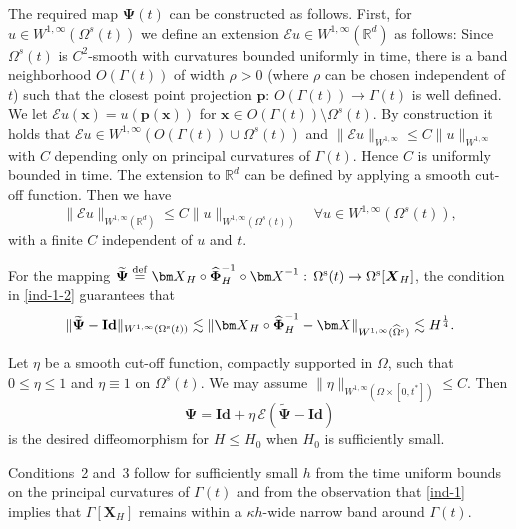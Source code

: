 \documentclass[11pt,reqno]{amsart}
\theoremstyle{definition}
\theoremstyle{plain}
\numberwithin{theorem}{section}
\numberwithin{proposition}{section}
\numberwithin{lemma}{section}
\numberwithin{equation}{section}
\newcommand{\bs}[1]{\boldsymbol{#1}}
\newcommand{\bx}{{\bs x}}
\def\R{{\mathbb{R}}}
\renewcommand{\(}{\bigl(}
\renewcommand{\)}{\bigr)}
\newcommand{\bld}[1]{\boldsymbol{#1}}
\newcommand{\bp}{\bld{p}}
\newcommand{\bX}{{\bm X}}
\def\eqd{\stackrel{\mathrm{def}}{=}}
\begin{document}
The required map ${\bs\Psi}(t)$ can be constructed as follows. First, for $u\in W^{1,\infty}({\Omega}^s(t))$ we define an extension $\mathcal{E} u\in W^{1,\infty}(\R^d)$ as follows: Since ${\Omega}^s(t)$ is  $C^2$-smooth with curvatures bounded uniformly in time, there is a band neighborhood $O(\Gamma(t))$ of width $\rho>0$ (where $\rho$ can be chosen independent of $t$) such that the closest point projection $\bp:\,O(\Gamma(t))\to \Gamma(t)$ is well defined. We let  $\mathcal{E} u(\bx) =u(\bp(\bx))$ for $\bx\in O(\Gamma(t))\setminus{\Omega}^s(t) $.   By construction it holds that $\mathcal{E} u\in W^{1,\infty}(O(\Gamma(t))\cup{\Omega}^s(t))$
and $\|\mathcal{E} u\|_{W^{1,\infty}}\le C\|u\|_{W^{1,\infty}}$ with $C$ depending only on principal curvatures of $\Gamma(t)$. Hence $C$ is uniformly bounded in time. The extension to $\R^d$ can be defined by applying a smooth cut-off function. Then we have 
\[
\|\mathcal{E} u\|_{W^{1,\infty}(\R^d)}\le C\|u\|_{W^{1,\infty}(\Omega^s(t))}\quad \forall u\in W^{1,\infty}({\Omega}^s(t)),
\]
with a finite $C$ independent of $u$ and $t$. 

For the mapping $\widetilde{\bs\Psi}\eqd  \bX_H\circ\widehat{\bs\Phi}_H^{-1}\circ\bX^{-1}:\,\Omega^{\rm s}(t)\to \Omega^{\rm s}[{\bs X}_H]$, the condition in \eqref{ind-1-2} guarantees that 
\[
\|\widetilde{\bs\Psi}-\mathbf{Id}\|_{W^{1,\infty}(\Omega^{\rm s}(t))}\lesssim
\|\bX_H\circ\widehat{\bs\Phi}_H^{-1}-\bX\|_{W^{1,\infty}(\widehat\Omega^{\rm s})}\lesssim H^{\frac14}.
\]

Let $\eta$ be a smooth cut-off function, compactly supported in $\Omega$, such that $0\le \eta\le 1$ and $\eta\equiv1$ on ${\Omega}^s(t)$. We may assume $\|\eta\|_{W^{1,\infty}(\Omega\times[0,t^\ast])}\le C$. Then
\[
{\bs\Psi} = \mathbf{Id} + \eta\,\mathcal{E} (\widetilde{\bs\Psi}-\mathbf{Id})
\]
is the desired diffeomorphism for $H\le H_0$ when $H_0$ is sufficiently small.\smallskip

Conditions~2 and~3 follow for sufficiently small $h$ from the time uniform  bounds on 
the principal curvatures of $\Gamma(t)$ and from the observation that \eqref{ind-1} 
implies that $\Gamma[\bX_H]$ remains within a $\kappa h$-wide narrow band around 
$\Gamma(t)$.

\medskip 
\end{document}

